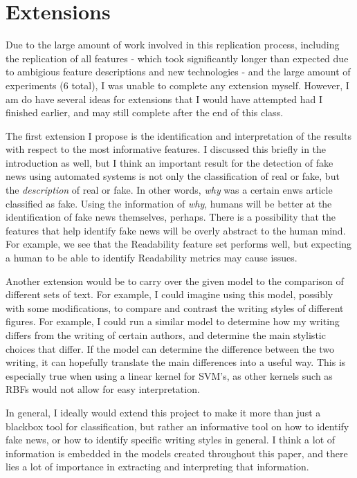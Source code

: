 \documentclass{article}
\begin{document}
\section{Extensions}

Due to the large amount of work involved in this replication process, including the replication of all features - which took significantly longer than expected due to ambigious feature descriptions and new technologies - and the large amount of experiments (6 total), I was unable to complete any extension myself. However, I am do have several ideas for extensions that I would have attempted had I finished earlier, and may still complete after the end of this class.

The first extension I propose is the identification and interpretation of the results with respect to the most informative features. I discussed this briefly in the introduction as well, but I think an important result for the detection of fake news using automated systems is not only the classification of real or fake, but the \emph{description} of real or fake. In other words, \emph{why} was a certain enws article classified as fake. Using the information of \emph{why}, humans will be better at the identification of fake news themselves, perhaps. There is a possibility that the features that help identify fake news will be overly abstract to the human mind. For example, we see that the Readability feature set performs well, but expecting a human to be able to identify Readability metrics may cause issues.

Another extension would be to carry over the given model to the comparison of different sets of text. For example, I could imagine using this model, possibly with some modifications, to compare and contrast the writing styles of different figures. For example, I could run a similar model to determine how my writing differs from the writing of certain authors, and determine the main stylistic choices that differ. If the model can determine the difference between the two writing, it can hopefully translate the main differences into a useful way. This is especially true when using a linear kernel for SVM's, as other kernels such as RBFs would not allow for easy interpretation.

In general, I ideally would extend this project to make it more than just a blackbox tool for classification, but rather an informative tool on how to identify fake news, or how to identify specific writing styles in general. I think a lot of information is embedded in the models created throughout this paper, and there lies a lot of importance in extracting and interpreting that information.
\end{document}
